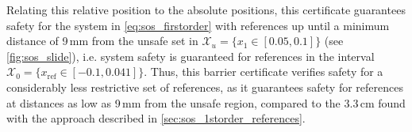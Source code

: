 Relating this relative position to the absolute positions, this  certificate guarantees  safety for the system in  \autoref{eq:sos_firstorder} with references up until a minimum distance of 9\,mm from the unsafe set in $\mathcal{X}_u=\{x_1\in[0.05,0.1] \}$ (see \autoref{fig:sos_slide}), i.e. system safety is guaranteed for references in the interval $\mathcal{X}_0=\{x_\text{ref}\in[-0.1,0.041] \}$.
Thus, this barrier certificate verifies safety for a considerably less restrictive set of references, as it guarantees safety for references at distances as low as 9\,mm from the unsafe region, compared to the 3.3\,cm found with the approach described in \autoref{sec:sos_1storder_references}.











